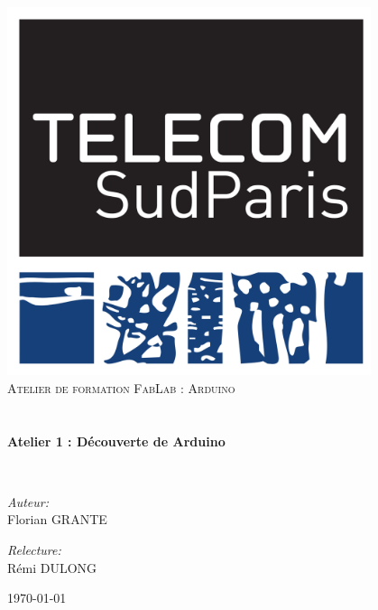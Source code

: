 \begin{titlepage}
\begin{center}

\includegraphics[width=0.8\textwidth]{./images/tsp}~\\[1cm]

\textsc{\LARGE Atelier de formation FabLab : Arduino}\\[1.5cm]

\textsc{\Large }\\[0.5cm]

\HRule \\[0.4cm]

{\huge \bfseries Atelier 1 : Découverte de Arduino\\[0.4cm] }

\HRule \\[1.5cm]

\begin{minipage}{0.4\textwidth}
\begin{flushleft} \large
\emph{Auteur:}\\
Florian \textsc{GRANTE}\\
\end{flushleft}
\end{minipage}
\begin{minipage}{0.4\textwidth}
\begin{flushright} \large
\emph{Relecture:} \\
Rémi \textsc{DULONG}
\end{flushright}
\end{minipage}

\vfill

{\large \today}

\end{center}
\end{titlepage}